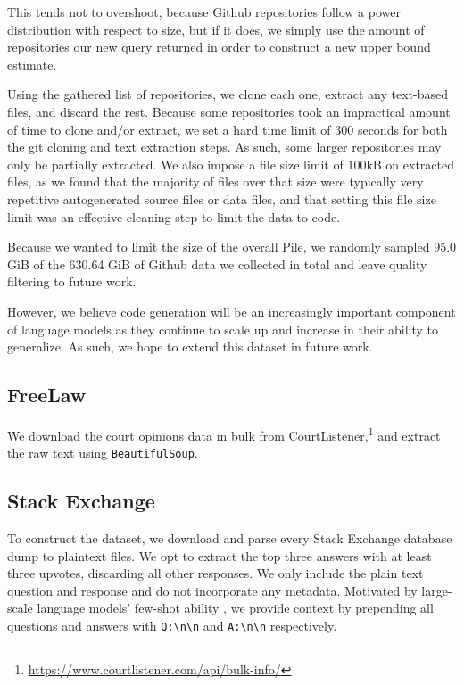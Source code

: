 \documentclass[11pt,a4paper]{article}
\begin{document}
\begin{appendices}
This tends not to overshoot, because Github repositories follow a power distribution with respect to size, but if it does, we simply use the amount of repositories our new query returned in order to construct a new upper bound estimate.

Using the gathered list of repositories, we clone each one, extract any text-based files, and discard the rest. Because some repositories took an impractical amount of time to clone and/or extract, we set a hard time limit of 300 seconds for both the git cloning and text extraction steps. As such, some larger repositories may only be partially extracted. We also impose a file size limit of 100kB on extracted files, as we found that the majority of files over that size were typically very repetitive autogenerated source files or data files, and that setting this file size limit was an effective cleaning step to limit the data to code.

Because we wanted to limit the size of the overall Pile, we randomly sampled 95.0 GiB of the 630.64 GiB of Github data we collected in total and leave quality filtering to future work. 

However, we believe code generation will be an increasingly important component of language models as they continue to scale up and increase in their ability to generalize. As such, we hope to extend this dataset in future work.

\subsection{FreeLaw}

We download the court opinions data in bulk from CourtListener,\footnote{ \url{https://www.courtlistener.com/api/bulk-info/}} and extract the raw text using \texttt{BeautifulSoup}.

\subsection{Stack Exchange}

To construct the dataset, we download and parse every Stack Exchange database dump to plaintext files. We opt to extract the top three answers with at least three upvotes, discarding all other responses. We only include the plain text question and response and do not incorporate any metadata. Motivated by large-scale language models’ few-shot ability \citep{GPT3}, we provide context by prepending all questions and answers with \texttt{Q:\textbackslash n\textbackslash n} and \texttt{A:\textbackslash n\textbackslash n} respectively. 


\end{appendices}
\end{document}
